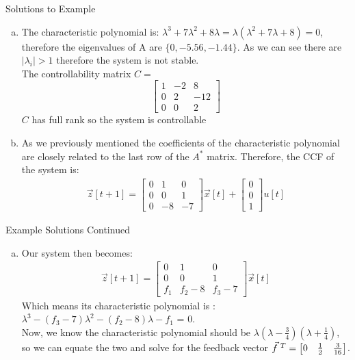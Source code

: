 \documentclass{beamer}
\begin{document}
	\begin{frame}{Solutions to Example}
	    \begin{enumerate}[(a)]
	        \item The characteristic polynomial is: $\lambda^3 + 7\lambda^2 + 8\lambda = \lambda(\lambda^2 +7\lambda +8) = 0$, therefore the eigenvalues of A are $\{0,-5.56, -1.44\}$. As we can see there are $|\lambda_i|>1$ therefore the system is not stable. \\
	        The controllability matrix $C =$ \[\begin{bmatrix}
	            1&-2&8\\
	            0&2&-12\\ 
	            0&0&2
	        \end{bmatrix}\]
	        $C$ has full rank so the system is controllable
	        
	        \item As we previously mentioned the coefficients of the characteristic polynomial are closely related to the last row of the $A^*$ matrix. Therefore, the CCF of the system is: 
	        \begin{align*}
	            \vec{z}[t+1] = 
	                \begin{bmatrix} 
	                    0&1&0\\
	                    0&0&1\\ 
	                    0&-8&-7
	            \end{bmatrix}\vec{x}[t] + \begin{bmatrix} 0 \\ 0 \\1 \end{bmatrix}u[t] 
	        \end{align*}
	    \end{enumerate}
	\end{frame}

	\begin{frame}{Example Solutions Continued}
	\begin{enumerate}[(c)]
	   \item Our system then becomes: 
	   \begin{align*}
	            \vec{z}[t+1] = 
	                \begin{bmatrix} 
	                    0&1&0\\
	                    0&0&1\\ 
	                    f_1&f_2-8&f_3-7
	            \end{bmatrix}\vec{x}[t] 
	        \end{align*}
	    Which means its characteristic polynomial is : $\lambda^3 - (f_3 -7)\lambda^2 -(f_2 - 8)\lambda - f_1$ = 0. \\
	   Now, we know the characteristic polynomial should be $\lambda(\lambda - \frac{3}{4})(\lambda + \frac{1}{4})$, so we can equate the two and solve for the feedback vector $\vec{f}\hspace{0.1cm}^T = \begin{bmatrix}  0 & \frac{1}{2}& \frac{3}{16}\end{bmatrix}$.
	\end{enumerate}
	\end{frame}
\end{document}
